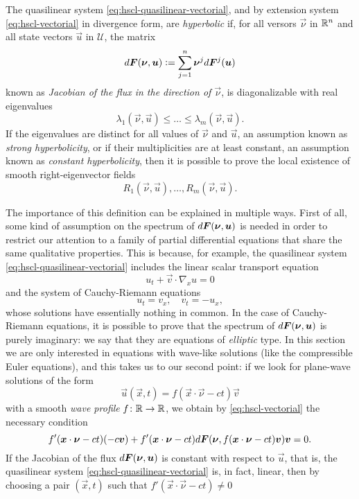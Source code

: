 \begin{defi}
The quasilinear system \eqref{eq:hscl-quasilinear-vectorial},
and by extension system \eqref{eq:hscl-vectorial} in divergence form,
are \emph{hyperbolic} if, for all versors $\vec{\nu}$ in $\mathbb{R}^n$ and all state
vectors $\vec{u}$ in $\mathcal{U}$, the matrix
\[
d\bm{F}(\bm{\nu},\bm{u}) \vcentcolon= \sum_{j=1}^n \bm{\nu}^j d\bm{F}^j(\bm{u})
\]
known as \emph{Jacobian of the flux in the direction of $\vec{\nu}$},
is diagonalizable with real eigenvalues
\[
\lambda_1(\vec{\nu},\vec{u}) \leq \dots \leq \lambda_m (\vec{\nu},\vec{u}).
\]
If the eigenvalues are distinct for all values of $\vec{\nu}$ and $\vec{u}$,
an assumption known as \emph{strong hyperbolicity},
or if their multiplicities are at least constant, an assumption
known as \emph{constant hyperbolicity}, then it is possible to
prove the local existence of smooth right-eigenvector fields
\[
R_1(\vec{\nu},\vec{u}), \dots, R_m (\vec{\nu},\vec{u}).
\]
\end{defi}
\noindent The importance of this definition can be explained in multiple ways.
First of all, some kind of assumption on the spectrum of
$d\bm{F}(\bm{\nu},\bm{u})$ is needed in order to restrict our attention
to a family of partial differential equations that share the same
qualitative properties. This is because, for example, the quasilinear
system \eqref{eq:hscl-quasilinear-vectorial} includes the linear scalar
transport equation
\[
u_t + \vec{v} \cdot \nabla_x u = 0
\]
and the system of Cauchy-Riemann equations
\[
u_t = v_x, \quad v_t = -u_x,
\]
whose solutions have essentially nothing in common. In the case
of Cauchy-Riemann equations, it is possible to prove that the spectrum
of $d\bm{F}(\bm{\nu},\bm{u})$ is purely imaginary: we say that they
are equations of \emph{elliptic} type.
In this section we are only interested in equations with wave-like solutions
(like the compressible Euler equations), and this takes us to our
second point: if we look for plane-wave solutions of the form
\[
\vec{u}(\vec{x},t) = f(\vec{x} \cdot \vec{\nu} - ct) \vec{v}
\]
with a smooth \emph{wave profile} $f \colon \mathbb{R} \to \mathbb{R}$,
we obtain by \eqref{eq:hscl-vectorial} the necessary condition
\[
f'(\bm{x} \cdot \bm{\nu} - ct) (-c\bm{v})
+ f'(\bm{x} \cdot \bm{\nu} - ct)
	d\bm{F}(\bm{\nu},f(\bm{x} \cdot \bm{\nu} - ct)\bm{v}) \bm{v} = 0.
\]
If the Jacobian of the flux $d\bm{F}(\bm{\nu},\bm{u})$ is constant
with respect to $\vec{u}$, that is, the quasilinear system
\eqref{eq:hscl-quasilinear-vectorial} is, in fact, linear, then
by choosing a pair $(\vec{x},t)$ such that $f'(\vec{x} \cdot \vec{\nu} - ct) \neq 0$
